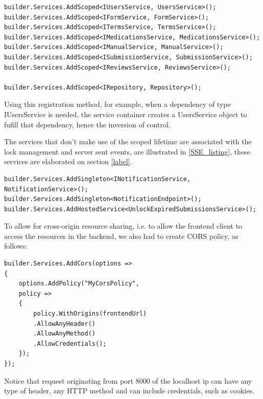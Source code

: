 \begin{lstlisting}[style=sharpc, caption={Registering Scoped Services in ASP.NET Core Dependency Injection Container.}, label={DI}]
builder.Services.AddScoped<IUsersService, UsersService>();
builder.Services.AddScoped<IFormService, FormService>();
builder.Services.AddScoped<ITermsService, TermsService>();
builder.Services.AddScoped<IMedicationsService, MedicationsService>();
builder.Services.AddScoped<IManualService, ManualService>();
builder.Services.AddScoped<ISubmissionService, SubmissionService>();
builder.Services.AddScoped<IReviewsService, ReviewsService>();

builder.Services.AddScoped<IRepository, Repository>();
\end{lstlisting}

Using this registration method, for example, when a dependency of type IUsersService is needed, the service container creates a UsersService object to fufill that dependency, hence the inversion of control.

The services that don't make use of the scoped lifetime are associated with the lock management and server sent events, are illustrated in \ref{SSE_listing}, these services are elaborated on section \ref{label}.

\begin{lstlisting}[style=sharpc, caption={Registering Scoped Services in ASP.NET Core Dependency Injection Container:}, label={SSE_listing}]
builder.Services.AddSingleton<INotificationService, NotificationService>();
builder.Services.AddSingleton<NotificationEndpoint>();
builder.Services.AddHostedService<UnlockExpiredSubmissionsService>();

\end{lstlisting}

To allow for cross-origin resource sharing, i.e. to allow the frontend client to access the resources in the backend, we also had to create CORS policy, as follows:

\begin{lstlisting}[style=sharpc, caption={Configuring CORS Policy in ASP.NET Core: Allowing Specific Origin with Full Access Control.}]
builder.Services.AddCors(options =>
{
	options.AddPolicy("MyCorsPolicy",
	policy =>
	{
		policy.WithOrigins(frontendUrl)
		.AllowAnyHeader()
		.AllowAnyMethod()
		.AllowCredentials();
	});
});
\end{lstlisting}

Notice that request originating from port 8000 of the localhost ip can have any type of header, any HTTP method and can include credentials, such as cookies.
\newpage

